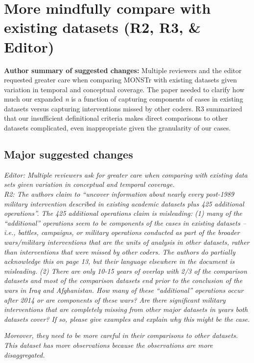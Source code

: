 \documentclass[fleqn,12pt]{article}
\begin{document}
\section{More mindfully compare with existing datasets (R2, R3, \& Editor)}

\noindent \textbf{Author summary of suggested changes:} Multiple reviewers and the editor requested greater care when comparing MONSTr with existing datasets given variation in temporal and conceptual coverage. The paper needed to clarify how much our expanded \textit{n} is a function of capturing components of cases in existing datasets versus capturing interventions missed by other coders. R3 summarized that our insufficient definitional criteria makes direct comparisons to other datasets complicated, even inappropriate given the granularity of our cases.

\subsection*{Major suggested changes}
\textit{Editor: Multiple reviewers ask for greater care when comparing with existing data sets given variation in conceptual and temporal coverage.} \\

\noindent
\textit{R2: The authors claim to “uncover information about nearly every post-1989 military intervention described in existing academic datasets plus 425 additional operations”.  The 425 additional operations claim is misleading: (1) many of the “additional” operations seem to be components of the cases in existing datasets – i.e., battles, campaigns, or military operations conducted as part of the broader wars/military interventions that are the units of analysis in other datasets, rather than interventions that were missed by other coders. The authors do partially acknowledge this on page 13, but their language elsewhere in the document is misleading. (2) There are only 10-15 years of overlap with 2/3 of the comparison datasets and most of the comparison datasets end prior to the conclusion of the wars in Iraq and Afghanistan. How many of these “additional” operations occur after 2014 or are components of these wars? Are there significant military interventions that are completely missing from other major datasets in years both datasets cover? If so, please give examples and explain why this might be the case.} 

\textit{Moreover, they need to be more careful in their comparisons to other datasets. This dataset has more observations because the observations are more disaggregated.} \\
\end{document}
